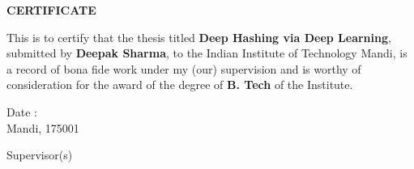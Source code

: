 \thispagestyle{empty}
\setcounter{page}{0}
\vspace*{4cm}
\centerline{\Large \bf CERTIFICATE}
\vspace*{2cm}
\noindent This is to certify that the thesis titled {\bf Deep Hashing via Deep Learning}, submitted by {\bf Deepak Sharma}, to the Indian Institute of Technology Mandi, is a record of bona fide work under my (our) supervision and is worthy of consideration for the award of the degree of {\bf B. Tech} of the Institute.\\[3cm]
%
\begin{minipage}{7cm}
	{Date :}\\
	Mandi, 175001 
\end{minipage}
\hfill\begin{minipage}{7cm}
	\centering
	Supervisor(s)
\end{minipage}


\clearpage
\thispagestyle{empty}




